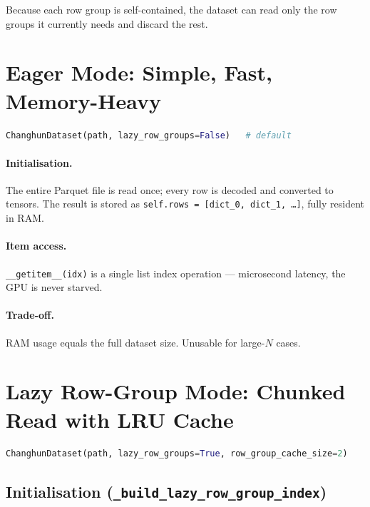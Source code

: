\documentclass{article}
\begin{document}
Because each row group is self-contained, the dataset can read only the
row groups it currently needs and discard the rest.

\section{Eager Mode: Simple, Fast, Memory-Heavy}

\begin{lstlisting}[language=Python]
ChanghunDataset(path, lazy_row_groups=False)   # default
\end{lstlisting}

\paragraph{Initialisation.}
The entire Parquet file is read once; every row is decoded and converted to
tensors.  The result is stored as \texttt{self.rows = [dict\_0, dict\_1,
\ldots]}, fully resident in RAM.

\paragraph{Item access.}
\texttt{\_\_getitem\_\_(idx)} is a single list index operation --- microsecond
latency, the GPU is never starved.

\paragraph{Trade-off.}
RAM usage equals the full dataset size.  Unusable for large-$N$ cases.

\section{Lazy Row-Group Mode: Chunked Read with LRU Cache}

\begin{lstlisting}[language=Python]
ChanghunDataset(path, lazy_row_groups=True, row_group_cache_size=2)
\end{lstlisting}

\subsection{Initialisation (\texttt{\_build\_lazy\_row\_group\_index})}
\end{document}
